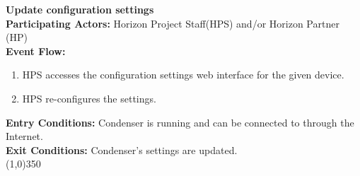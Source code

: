 	\textbf{Update configuration settings} \\	 
	\textbf{Participating Actors:} Horizon Project Staff(HPS) and/or Horizon Partner (HP) \\
	\textbf{Event Flow:}
	\begin{enumerate}
\item HPS accesses the configuration settings web interface for the given device. 
\item HPS re-configures the settings.
    \end{enumerate}
	\textbf{Entry Conditions:} Condenser is running and can be connected to through the Internet.\\
	\textbf{Exit Conditions:} Condenser's settings are updated.\\
	\line(1,0){350}			